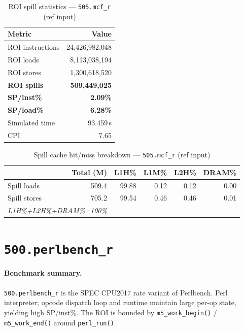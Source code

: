 \documentclass[11pt,a4paper]{article}
\begin{document}
\begin{table}[H]
\centering
\caption{ROI spill statistics --- \texttt{505.mcf\_r} (ref input)}
\label{tab:mcf_ref_roi}
\begin{tabular}{lr}
\toprule
\textbf{Metric} & \textbf{Value} \\
\midrule
ROI instructions & 24,426,982,048 \\
ROI loads        & 8,113,038,194 \\
ROI stores       & 1,300,618,520 \\
\textbf{ROI spills}   & \textbf{509,449,025} \\
\textbf{SP/inst\%}   & \textbf{2.09\%} \\
\textbf{SP/load\%}   & \textbf{6.28\%} \\
Simulated time   & 93.459\,s \\
CPI              & 7.65 \\
\bottomrule
\end{tabular}
\end{table}

\begin{table}[H]
\centering
\caption{Spill cache hit/miss breakdown --- \texttt{505.mcf\_r} (ref input)}
\label{tab:mcf_ref_cache}
\begin{tabular}{lrrrrr}
\toprule
\textbf{} & \textbf{Total (M)} & \textbf{L1H\%} & \textbf{L1M\%} & \textbf{L2H\%} & \textbf{DRAM\%} \\
\midrule
Spill loads  & 509.4 & 99.88 & 0.12 & 0.12 & 0.00 \\
Spill stores & 705.2 & 99.54 & 0.46 & 0.46 & 0.01 \\
\multicolumn{2}{l}{\small\textit{L1H\%+L2H\%+DRAM\%=100\%}} \\
\bottomrule
\end{tabular}
\end{table}


\section{\texttt{500.perlbench\_r}}
\label{sec:perlbench}

\paragraph{Benchmark summary.}
\texttt{500.perlbench\_r} is the SPEC CPU2017 rate variant of Perlbench.
Perl interpreter; opcode dispatch loop and runtime maintain large per-op state, yielding high SP/inst\%.
The ROI is bounded by \texttt{m5\_work\_begin()} / \texttt{m5\_work\_end()}
around \texttt{perl\_run()}.
\end{document}
